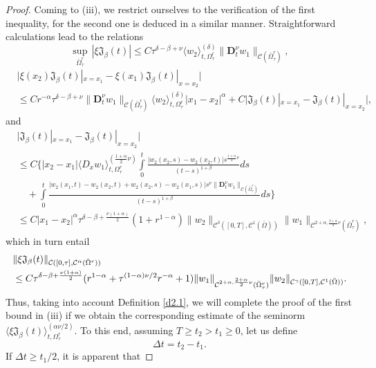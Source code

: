 \documentclass[reqno]{amsart}
\def\C {\mathcal{C}}
\theoremstyle{definition}
\numberwithin{equation}{section}
\begin{document}
\begin{proof}
Coming to (iii), we restrict ourselves to the verification of the first inequality, for the second one is deduced in a similar manner.
Straightforward calculations lead to the relations
\[
\underset{\bar{\Omega}_{\tau}^{r}}{\sup}\,|\xi\mathfrak{J}_{\beta}(t)|\leq C\tau^{\delta-\beta+\nu}
\langle w_2\rangle_{t,\Omega_{\tau}^{r}}^{(\delta)}\|\mathbf{D}_{t}^{\nu}w_1\|_{\C(\bar{\Omega}_{\tau}^{r})},
\]
\begin{align*}
&\Big|\xi(x_2)\mathfrak{J}_{\beta}(t)|_{x=x_1}-\xi(x_1)\mathfrak{J}_{\beta}(t)|_{x=x_2}\Big|
\\
&
\leq C r^{-\alpha}\tau^{\delta-\beta+\nu}
\|\mathbf{D}_{t}^{\nu}w_1\|_{\C(\bar{\Omega}_{\tau}^{r})}
\langle w_2\rangle_{t,\Omega_{\tau}^{r}}^{(\delta)}|x_1-x_2|^{\alpha}+C\Big|\mathfrak{J}_{\beta}(t)|_{x=x_1}-\mathfrak{J}_{\beta}(t)|_{x=x_2}\Big|,
\end{align*}
and
\begin{align*}
&\Big|\mathfrak{J}_{\beta}(t)|_{x=x_1}-\mathfrak{J}_{\beta}(t)|_{x=x_2}\Big|
\\
&
\leq C\Big\{|x_2-x_1|\langle D_{x}w_1\rangle_{t,\Omega_{\tau}^{r}}^{(\frac{1+\alpha}{2}\nu)}\int\limits_{0}^{t}\frac{|w_2(x_2,s)-w_2(x_2,t)|s^{\frac{1+\alpha}{2}\nu}}{(t-s)^{1+\beta}}ds
\\&\quad+\int\limits_{0}^{t}\frac{|w_2(x_1,t)-w_2(x_2,t)+w_2(x_2,s)-w_{2}(x_1,s)|s^{\nu}\|\mathbf{D}_{t}^{\nu}w_1\|_{\C(\bar{\Omega}_{\tau}^{r})}}{(t-s)^{1+\beta}}ds
\Big\}\\
&
\leq C |x_1-x_2|^{\alpha}\tau^{\delta-\beta+\frac{\nu(1+\alpha)}{2}}(1+r^{1-\alpha})
\|w_2\|_{\C^{\delta}([0,T],\C^{1}(\bar{\Omega}))}\|w_1\|_{\C^{2+\alpha,\frac{2+\alpha}{2}\nu}(\bar{\Omega}_{\tau}^{r})},\end{align*}
which in turn entail
\begin{align}\label{4.3}\notag
&\|\xi\mathfrak{J}_{\beta}(t)\|_{\C([0,\tau],\C^{\alpha}(\bar{\Omega}^{r}))}
\\&\leq
C\tau^{\delta-\beta+\frac{\nu(1+\alpha)}{2}}
(r^{1-\alpha}+\tau^{(1-\alpha)\nu/2}r^{-\alpha}+1)\|w_1\|_{\C^{2+\alpha,\frac{2+\alpha}{2}\nu}(\bar{\Omega}^{r}_{\tau})}\|w_{2}\|_{\C^{\gamma}([0,T],\C^{1}(\bar{\Omega}))}.
\end{align}
Thus, taking into account Definition \ref{d2.1}, we will complete the proof of the first bound in (iii) if we obtain the corresponding estimate of the
seminorm $\langle \xi\mathfrak{J}_{\beta}(t)\rangle_{t,\Omega_{\tau}^{r}}^{(\alpha\nu/2)}$. To this end, assuming $T\geq t_{2}>t_1\geq 0$,
let us define
$$\Delta t=t_{2}-t_1.$$
If $\Delta t\geq t_1/2$, it is apparent that

\end{proof}
\end{document}
